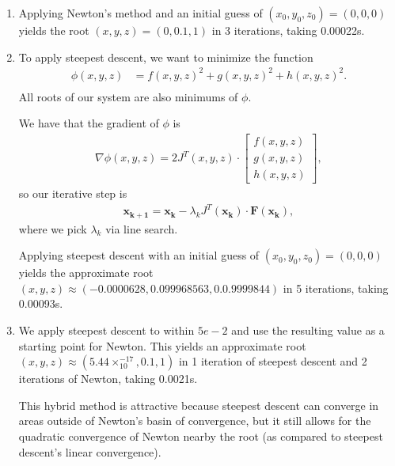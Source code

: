 \documentclass[10pt]{article}
\renewcommand{\vec}{\mathbf}
\begin{document}
\begin{enumerate}
    \begin{enumerate}
      \item Applying Newton's method and an initial guess of \((x_0, y_0, z_0) = (0, 0, 0)\) yields the root \((x, y, z) = (0, 0.1, 1)\) in 3 iterations, taking 0.00022s.
      \item To apply steepest descent, we want to minimize the function \begin{align*}
          \phi(x, y, z) &= f(x, y, z)^2 + g(x, y, z)^2 + h(x, y, z)^2. \\
      \end{align*} All roots of our system are also minimums of \(\phi\). 

      We have that the gradient of \(\phi\) is \begin{align*}
          \nabla \phi(x, y, z) = 2J^T(x, y, z)\cdot \begin{bmatrix}
            f(x, y, z) \\ g(x, y, z) \\ h(x, y, z)
          \end{bmatrix},
      \end{align*} so our iterative step is \begin{align*}
          \vec{x_{k+1}} = \vec{x_k} - \lambda_k J^T(\vec{x_k}) \cdot   \vec{F(\vec{x_k})},
      \end{align*} where we pick \(\lambda_k\) via line search.

      Applying steepest descent with an initial guess of \((x_0, y_0, z_0) = (0, 0, 0)\) yields the approximate root \((x,y,z) \approx (-0.0000628, 0.099968563, 0.0.9999844)\) in 5 iterations, taking 0.00093s.

      \item We apply steepest descent to within \(5e-2\) and use the resulting value as a starting point for Newton. This yields an approximate root \((x, y, z) \approx (5.44\times_10^{-17}, 0.1, 1)\) in 1 iteration of steepest descent and 2 iterations of Newton, taking 0.0021s.
      
      This hybrid method is attractive because steepest descent can converge in areas outside of Newton's basin of convergence, but it still allows for the quadratic convergence of Newton nearby the root (as compared to steepest descent's linear convergence).
    \end{enumerate}

    {\small }
\end{enumerate}
\end{document}
